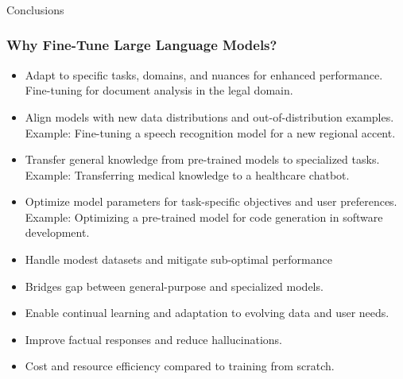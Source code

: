 \begin{frame}[fragile]\frametitle{}
\begin{center}
{\Large Conclusions}
\end{center}
\end{frame}

\begin{frame}[fragile]\frametitle{Why Fine-Tune Large Language Models?}
  \begin{itemize}
    \item Adapt to specific tasks, domains, and nuances for enhanced performance. Fine-tuning for document analysis in the legal domain.
    \item Align models with new data distributions and out-of-distribution examples. Example: Fine-tuning a speech recognition model for a new regional accent.
    \item Transfer general knowledge from pre-trained models to specialized tasks. Example: Transferring medical knowledge to a healthcare chatbot.
    \item Optimize model parameters for task-specific objectives and user preferences. Example: Optimizing a pre-trained model for code generation in software development.
    \item Handle modest datasets and mitigate sub-optimal performance
    \item Bridges gap between general-purpose and specialized models.
    \item Enable continual learning and adaptation to evolving data and user needs.
    \item Improve factual responses and reduce hallucinations.
    \item Cost and resource efficiency compared to training from scratch.
  \end{itemize}
\end{frame}

